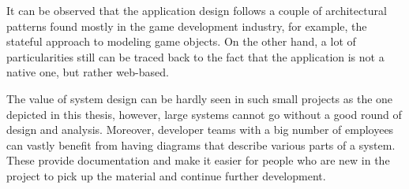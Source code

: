It can be observed that the application design follows a couple of architectural
patterns found mostly in the game development industry, for example, the
stateful approach to modeling game objects. On the other hand, a lot of
particularities still can be traced back to the fact that the application is not
a native one, but rather web-based.

The value of system design can be hardly seen in such small projects as the one
depicted in this thesis, however, large systems cannot go without a good round
of design and analysis. Moreover, developer teams with a big number of employees
can vastly benefit from having diagrams that describe various parts of a system.
These provide documentation and make it easier for people who are new in the
project to pick up the material and continue further development.

\clearpage
